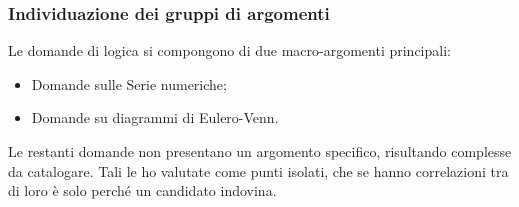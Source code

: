 \subsubsection{Individuazione dei gruppi di argomenti}\mbox{}
\label{Individuazione dei gruppi di argomenti}
Le domande di logica si compongono di due macro-argomenti principali:
\begin{itemize}
\item Domande sulle Serie numeriche;
\item Domande su diagrammi di Eulero-Venn.
\end{itemize}
\noindent
Le restanti domande non presentano un argomento specifico, risultando complesse da catalogare. Tali le ho valutate come punti isolati, che se hanno correlazioni tra di loro è solo perché un candidato indovina.

